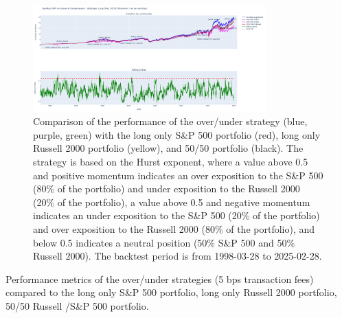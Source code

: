 \documentclass[11pt]{extarticle}
\begin{document}
\begin{figure}[ht]
    \centering
    \includegraphics[width=0.8\textwidth]{img/backtest_long_neutral.png}
    \caption{Comparison of the performance of the over/under strategy (blue, purple, green) with the long only S\&P 500 portfolio (red),
        long only Russell 2000 portfolio (yellow), and 50/50 portfolio (black). The strategy is based on the Hurst
        exponent, where a value above 0.5 and positive momentum indicates an over exposition to the S\&P 500 (80\% of the
        portfolio) and under exposition to the Russell 2000 (20\% of the portfolio),
        a value above 0.5 and negative momentum indicates an under exposition to the S\&P 500 (20\% of the portfolio) and 
        over exposition to the Russell 2000 (80\% of the portfolio),
        and below 0.5 indicates a neutral position (50\% S\&P 500 and 50\% Russell 2000).
        The backtest period is from 1998-03-28 to 2025-02-28.}
    \label{fig:cumulative_performance}
\end{figure}

\FloatBarrier

\begin{table}[!h]
    \centering
    \caption{Performance metrics of the over/under strategies (5 bps transaction fees) compared to the long only S\&P 500
    portfolio, long only Russell 2000 portfolio, 50/50 Russell /S\&P 500 portfolio.}
    \label{tab:performance_table}
\end{table}
\end{document}
